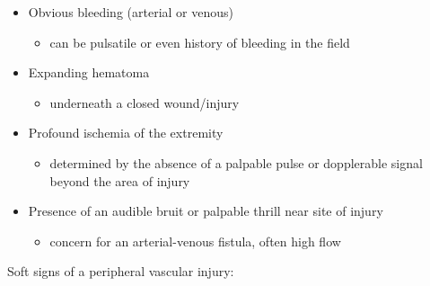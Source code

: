 \documentclass[
]{book}
\providecommand{\tightlist}{%
  \setlength{\itemsep}{0pt}\setlength{\parskip}{0pt}}
\begin{document}
\begin{itemize}
\item
  Obvious bleeding (arterial or venous)

  \begin{itemize}
  \tightlist
  \item
    can be pulsatile or even history of bleeding in the field
  \end{itemize}
\item
  Expanding hematoma

  \begin{itemize}
  \tightlist
  \item
    underneath a closed wound/injury
  \end{itemize}
\item
  Profound ischemia of the extremity

  \begin{itemize}
  \tightlist
  \item
    determined by the absence of a palpable pulse or dopplerable
    signal beyond the area of injury
  \end{itemize}
\item
  Presence of an audible bruit or palpable thrill near site of injury

  \begin{itemize}
  \tightlist
  \item
    concern for an arterial-venous fistula, often high flow
  \end{itemize}
\end{itemize}

Soft signs of a peripheral vascular injury:
\end{document}
